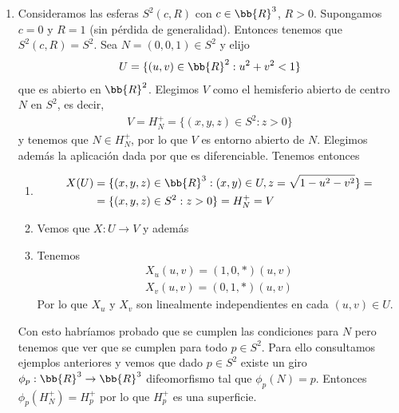 \begin{ejemplo}
\begin{enumerate}
\begin{enumerate}
            \item Sea $q'\in U'=U$, entonces tenemos que 
            \begin{gather*}
                (dX')_q = d(\phi \circ X)_{q'}
            \end{gather*}
        \end{enumerate}

        \item Consideramos las esferas $S^2(c, R)$ con $c\in \bb{R}^3$, $R>0$. Supongamos $c=0$ y $R=1$ (sin pérdida de generalidad). Entonces tenemos que $S^2(c, R) = S^2$. Sea $N=(0,0,1)\in S^2$ y elijo 
        \begin{gather*}
            U=\{(u,v)\in \bb{R}^2 : u^2 + v^2 <1\}
        \end{gather*}
        que es abierto en $\bb{R}^2$. Elegimos $V$ como el hemisferio abierto de centro $N$ en $S^2$, es decir,
        \begin{gather*}
            V = H_N^+ = \{(x,y,z)\in S^2 : z>0\}
        \end{gather*}
        y tenemos que $N\in H_N^+$, por lo que $V$ es entorno abierto de $N$. Elegimos además la aplicación dada por 
        que es diferenciable. Tenemos entonces
        \begin{enumerate}
            \item \begin{align*}
                X(U)&=\{(x,y,z)\in \bb{R}^3 : (x,y)\in U, z=\sqrt{1-u^2-v^2}\} =\\
                &= \{(x,y,z)\in S^2 : z>0\} = H_N^+ = V
            \end{align*}

            \item Vemos que $X:U\to V$ y además 
            \item Tenemos 
            \begin{gather*}
                X_u(u,v) = (1,0,\ast)(u,v)\\
                X_v(u,v) = (0,1,\ast)(u,v)
            \end{gather*}
            Por lo que $X_u$ y $X_v$ son linealmente independientes en cada $(u,v)\in U$.
        \end{enumerate}
        Con esto habríamos probado que se cumplen las condiciones para $N$ pero tenemos que ver que se cumplen para todo $p\in S^2$. Para ello consultamos ejemplos anteriores y vemos que dado $p\in S^2$ existe un giro $\phi_p : \bb{R}^3 \to \bb{R}^3$ difeomorfismo tal que $\phi_p(N)=p$. Entonces $\phi_p(H_N^+) = H_p^+$ por lo que $H_p^+$ es una superficie.\\


\end{enumerate}
\end{ejemplo}
